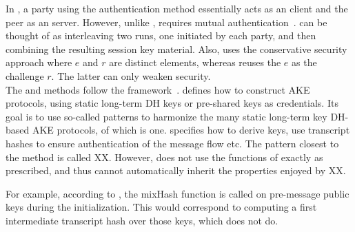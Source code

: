 In \mEdhoc, a party using the \mStat{} authentication method
essentially acts as an \mOptls{} client and the peer as an \mOptls{}
server.
%
However, unlike \mOptls{}, \mEdhoc{} requires mutual
authentication~\cite{ietf-lake-reqs-04}.
%
\mStatStat{} can be thought of as interleaving two \mOptls{}
runs, one initiated by each party, and then combining the resulting session key
material.
%
Also, \mOptls{} uses the conservative security approach where $e$ and $r$
are distinct elements, whereas \mEdhoc{} reuses the $e$ as the challenge $r$.
%
The latter can only weaken security.\\
%

\runhead{\mNoise{}}
The \mStatStat{} and \mPskPsk{} methods follow the \mNoise{}
framework~\cite{perrin2016noise}.
%
\mNoise{} defines how to construct AKE protocols, using static long-term DH
keys or pre-shared keys as credentials.
%
Its goal is to use so-called patterns to harmonize the many static long-term
key DH-based AKE protocols, of which \mOptls{} is one.
%
\mNoise{} specifies how to derive keys, use transcript hashes to ensure
authentication of the message flow etc.
%
The \mNoise{} pattern closest to the \mStatStat{} method is called XX.
%
However, \mEdhoc{} does not use the functions of \mNoise{} exactly as
prescribed, and thus cannot automatically inherit the properties enjoyed by XX.
%

For example, according to \mNoise{}, the mixHash function is called on
pre-message public keys during the initialization.
%
This would correspond to \mEdhoc{} computing a first intermediate transcript
hash over those keys, which \mEdhoc{} does not do.
%

